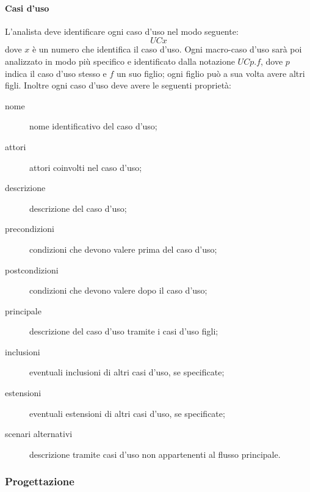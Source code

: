 \paragraph{Casi d'uso}
L'analista deve identificare ogni caso d'uso nel modo seguente:
	\[UCx\]
dove $x$ è un numero che identifica il caso d'uso. Ogni macro-caso d'uso sarà poi analizzato in modo più specifico e identificato dalla notazione $UCp.f$, dove $p$ indica il caso d'uso stesso e $f$ un suo figlio; ogni figlio può a sua volta avere altri figli. Inoltre ogni caso d'uso deve avere le seguenti proprietà:
\begin{description}
	\item[nome] nome identificativo del caso d'uso;
	\item[attori] attori coinvolti nel caso d'uso;
	\item[descrizione] descrizione del caso d'uso;
	\item[precondizioni] condizioni che devono valere prima del caso d'uso;
	\item[postcondizioni] condizioni che devono valere dopo il caso d'uso;
	\item[ principale] descrizione del caso d'uso tramite i casi d'uso figli;
	\item[inclusioni] eventuali inclusioni di altri casi d'uso, se specificate;
	\item[estensioni] eventuali estensioni di altri casi d'uso, se specificate;
	\item[scenari alternativi] descrizione tramite casi d'uso non appartenenti al flusso principale.
\end{description}

\subsubsection{Progettazione} \label{sec:design}
